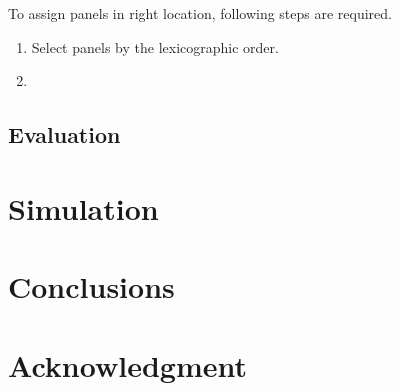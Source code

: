 \documentclass[conference]{IEEEtran}
\begin{document}
To assign panels in right location, following steps are required.
\begin{enumerate}[(1)]
\item Select panels by the lexicographic order.
\item 
\end{enumerate}
\subsection{Evaluation}

\section{Simulation}\label{Sec6}

\section{Conclusions}\label{Sec7}

\section*{Acknowledgment}



\renewcommand\refname{Reference}


\end{document}
